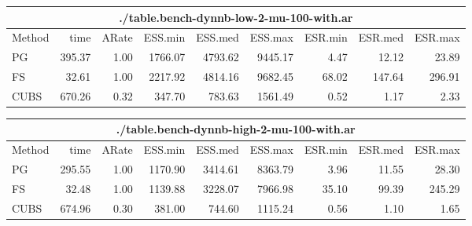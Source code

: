 \documentclass[11pt]{article}
\begin{document}
\begin{table}
\begin{tabular}{l r r r r r r r r } 
\hline
\multicolumn{9}{c}{./table.bench-dynnb-low-2-mu-100-with.ar} \\
\hline
          Method  &     time &    ARate &  ESS.min &  ESS.med &  ESS.max &  ESR.min &  ESR.med &  ESR.max \\ 
              PG  &   395.37 &     1.00 &  1766.07 &  4793.62 &  9445.17 &     4.47 &    12.12 &    23.89 \\ 
              FS  &    32.61 &     1.00 &  2217.92 &  4814.16 &  9682.45 &    68.02 &   147.64 &   296.91 \\ 
            CUBS  &   670.26 &     0.32 &   347.70 &   783.63 &  1561.49 &     0.52 &     1.17 &     2.33
 \end{tabular}

\begin{tabular}{l r r r r r r r r } 
\hline
\multicolumn{9}{c}{./table.bench-dynnb-high-2-mu-100-with.ar} \\
\hline
          Method  &     time &    ARate &  ESS.min &  ESS.med &  ESS.max &  ESR.min &  ESR.med &  ESR.max \\ 
              PG  &   295.55 &     1.00 &  1170.90 &  3414.61 &  8363.79 &     3.96 &    11.55 &    28.30 \\ 
              FS  &    32.48 &     1.00 &  1139.88 &  3228.07 &  7966.98 &    35.10 &    99.39 &   245.29 \\ 
            CUBS  &   674.96 &     0.30 &   381.00 &   744.60 &  1115.24 &     0.56 &     1.10 &     1.65
 \end{tabular}



\end{table}



{}

\end{document}
